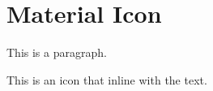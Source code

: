 
\chapter{\label{material-icon}Material Icon}
\par This is a paragraph.
\par {}
\par This is an icon  that inline with the text. 